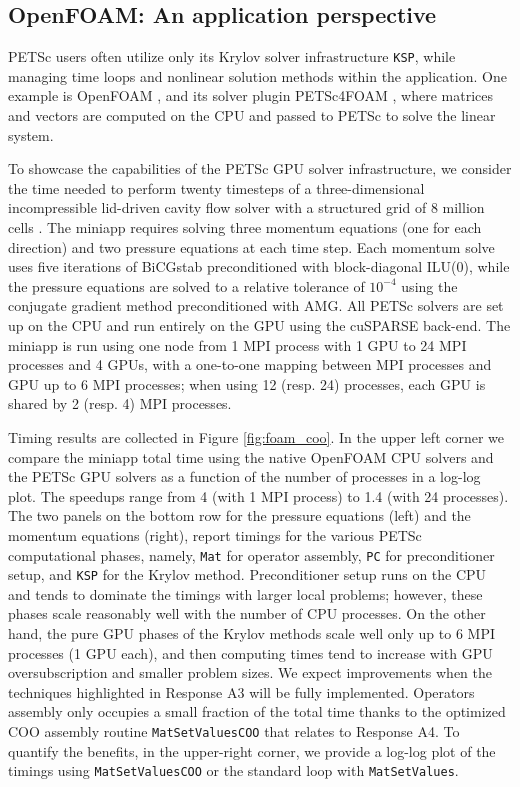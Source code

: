 \documentclass[10pt,journal,compsoc]{IEEEtran}
\begin{document}
\subsection{OpenFOAM: An application perspective}
\label{subsec:openfoam}

PETSc users often utilize only its
Krylov solver infrastructure {\tt KSP}, while managing time loops and nonlinear
solution methods within the application. One example is OpenFOAM \cite{OPENFOAM}, and its solver plugin PETSc4FOAM \cite{PETSc4FOAM}, where matrices and vectors are computed on the CPU and passed to PETSc to solve the linear system.

To showcase the capabilities of the PETSc GPU solver infrastructure,
we consider
the time needed to perform twenty timesteps of a three-dimensional incompressible
lid-driven cavity flow solver with a structured grid of 8 million cells \cite{OpenFOAMLid}.
The miniapp requires solving three momentum equations (one for each direction) and two pressure equations at each time step. Each
momentum solve uses five iterations of BiCGstab preconditioned with block-diagonal ILU(0), while the pressure equations are solved to a relative tolerance
of $10^{-4}$ using the conjugate gradient method preconditioned with AMG.
All PETSc solvers are set up on the CPU and run
entirely on the GPU using the cuSPARSE back-end.  
The miniapp is run using one node from 1 MPI process with 1 GPU to 24 MPI processes and 4
GPUs, with a one-to-one mapping between MPI processes and GPU up to 6 MPI
processes;
when using 12 (resp. 24) processes, each GPU is shared by 2 (resp. 4)
MPI processes.

Timing results are collected in Figure \ref{fig:foam_coo}. In the upper left
corner we compare the miniapp total time using the native OpenFOAM
CPU solvers and the PETSc GPU solvers as a function of the number of processes in a log-log plot. The speedups
range from 4 (with 1 MPI process) to 1.4 (with 24 processes).
The two panels on the bottom
row for the pressure equations (left) and the momentum equations (right),
report  timings for the various PETSc computational phases,
namely, {\tt Mat} for operator assembly, {\tt PC} for preconditioner setup, and
{\tt KSP} for the Krylov method.
Preconditioner setup runs on the CPU and tends to dominate
the timings with larger local problems; however, these phases scale reasonably
well with the number of CPU processes. On the other hand, the pure GPU phases of
the Krylov methods scale well only up to 6 MPI processes (1 GPU each), and then
computing times tend to increase with GPU oversubscription and smaller problem sizes.
We expect improvements when the techniques highlighted in Response A3 will be fully implemented.
Operators assembly only occupies a small fraction of the
total time thanks to the optimized COO assembly routine {\tt MatSetValuesCOO} that relates to Response A4. To quantify the
benefits, in the upper-right corner, we provide a log-log plot of the timings using {\tt MatSetValuesCOO}
or the standard loop with {\tt MatSetValues}.
\end{document}
